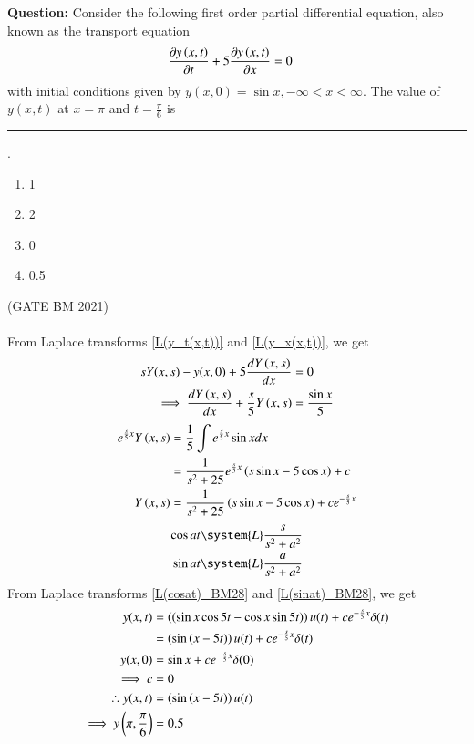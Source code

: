 \documentclass[journal,12pt,twocolumn]{IEEEtran}
\theoremstyle{remark}
\begin{document}
\textbf{Question:} Consider the following first order partial differential equation, also known as the transport equation
\begin{align*}
\frac{\partial y\left(x,t\right)}{\partial t}+5\frac{\partial y\left(x,t\right)}{\partial x}&=0
\end{align*}
with initial conditions given by $y(x, 0) = \sin x,-\infty < x < \infty$. The value of $y(x, t)$ at $x = \pi$ and $t=\frac{\pi}{6}$ is  \rule{1cm}{0.15mm}.
\begin{enumerate}[label=(\Alph*)]
\item 1
\item 2
\item 0
\item 0.5
\end{enumerate}
\hfill(GATE BM 2021)
\\
\solution
\\
From Laplace transforms \eqref{L(y_t(x,t))} and \eqref{L(y_x(x,t))}, we get
\begin{align}
sY(x,s)-y(x,0) + 5\frac{dY\left(x,s\right)}{dx} &= 0\\
\implies \frac{dY\left(x,s\right)}{dx} + \frac{s}{5}Y\left(x,s\right) &= \frac{\sin{x}}{5}
\end{align}
\begin{align}
e^{\frac{s}{5}x}Y\left(x,s\right) &= \frac{1}{5} \int e^{\frac{s}{5}x}\sin{x}dx \\
&= \frac{1}{s^2+25}e^{\frac{s}{5}x} \left(s\sin{x}-5\cos{x}\right) + c\\
Y\left(x,s\right) &= \frac{1}{s^2+25} \left(s\sin{x}-5\cos{x}\right) + ce^{-\frac{s}{5}x}
\end{align}
\begin{align}
\label{L(cosat)_BM28} \cos{at} &\system{L} \frac{s}{s^2+a^2} \\
\label{L(sinat)_BM28} \sin{at} &\system{L} \frac{a}{s^2+a^2}
\end{align}
From Laplace transforms \eqref{L(cosat)_BM28} and \eqref{L(sinat)_BM28}, we get
\begin{align}
y(x,t) &= \left(\left(\sin{x}\cos{5t}-\cos{x}\sin{5t}\right)\right)u(t)+ce^{-\frac{s}{5}x}\delta(t)\\
&= \left(\sin{\ensuremath{\left(x-5t\right)}}\right)u(t)+ce^{-\frac{s}{5}x}\delta(t)\\
y(x,0) &= \sin{x}+ce^{-\frac{s}{5}x}\delta(0)\\
\implies c &= 0\\
\therefore y(x,t) &= \left(\sin{\ensuremath{\left(x-5t\right)}}\right)u(t)\\
\implies y\left(\pi,\frac{\pi}{6}\right) &= 0.5
\end{align}
\end{document}
